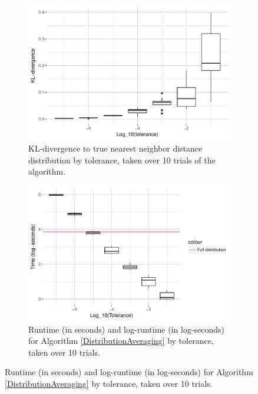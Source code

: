 \documentclass{article}
\begin{document}
\begin{figure}
\begin{subfigure}{.49\textwidth}
        \includegraphics[width=\linewidth]{Figures/NearestNeighbor/CDR3/div_by_tol.pdf}
    	\caption{KL-divergence to true nearest neighbor distance distribution by tolerance, taken over 10 trials of the algorithm.}
    	\label{fig:NNDivergences}
	\end{subfigure}
    \begin{subfigure}{.49\textwidth}
    	\includegraphics[width=0.9\linewidth]{Figures/NearestNeighbor/CDR3/log_time_by_tol.pdf}
    	\caption{Runtime (in seconds) and log-runtime (in log-seconds) for Algorithm \ref{DistributionAveraging} by tolerance, taken over 10 trials.}
    	\label{fig:NNTimes}
    \end{subfigure}
\end{figure}
\end{document}

